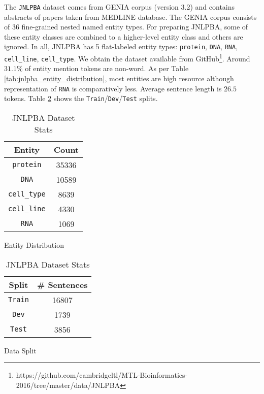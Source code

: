 The \texttt{JNLPBA}\cite{kim2004introduction} dataset comes from GENIA\cite{kim2003genia} corpus (version 3.2) and contains abstracts of papers taken from MEDLINE database. The GENIA corpus consists of 36 fine-grained nested named entity types. For preparing JNLPBA, some of these entity classes are combined to a higher-level entity class and others are ignored. In all, JNLPBA has 5 flat-labeled entity types: \texttt{protein}, \texttt{DNA}, \texttt{RNA}, \texttt{cell\_line}, \texttt{cell\_type}. We obtain the dataset available from GitHub\footnote{https://github.com/cambridgeltl/MTL-Bioinformatics-2016/tree/master/data/JNLPBA}. Around $31.1\%$ of entity mention tokens are non-word. As per Table \ref{tab:jnlpba_entity_distribution}, most entities are high resource although representation of \texttt{RNA} is comparatively less. Average sentence length is $26.5$ tokens. Table \ref{tab:jnlpba_dataset_split} shows the \texttt{Train}/\texttt{Dev}/\texttt{Test} splits. 

\begin{table}[h!]
\begin{subtable}[t]{.48\linewidth}
\centering
\begin{tabular}{|c|c|}\hline
	\textbf{Entity} & \textbf{Count}\\\hline
	\texttt{protein} & 35336\\\hline
    \texttt{DNA} & 10589\\\hline
    \texttt{cell\_type} & 8639\\\hline
    \texttt{cell\_line} & 4330\\\hline
    \texttt{RNA} & 1069\\\hline
	\end{tabular}
	\caption{Entity Distribution}
	\label{tab:jnlpba_entity_distribution}
\end{subtable}
\begin{subtable}[t]{.48\linewidth}
\centering
\begin{tabular}{|c|c|}\hline
	\textbf{Split} & \textbf{\# Sentences}\\\hline
	\texttt{Train} & 16807\\\hline
	\texttt{Dev} & 1739\\\hline
	\texttt{Test} & 3856\\\hline
	\end{tabular}
	\caption{Data Split}
	\label{tab:jnlpba_dataset_split}
\end{subtable}
\caption{JNLPBA Dataset Stats}
\end{table}

